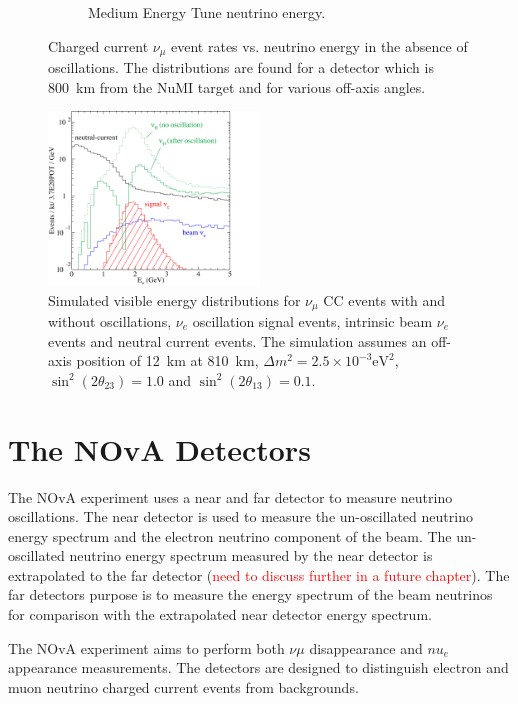 \begin{figure}
\begin{subfigure}[b]{0.45\textwidth}
    \caption{Medium Energy Tune neutrino energy.}
    \label{fig:NuESpectra_MEAndLE_b}
  \end{subfigure}
  \caption{Charged current $\nu_{\mu}$ event rates vs. neutrino
    energy in the absence of oscillations. The distributions are found
  for a detector which is 800~km from the NuMI target and for various
  off-axis angles.}
  \label{fig:NuESpectra_MEAndLE}
\end{figure}


\begin{figure}
  \centering
  \includegraphics[width=0.5\textwidth]{../../img/beam/060-sig-and-bg-rates-thumb.png}
  \caption{Simulated visible energy distributions for $\nu_{\mu}$ CC
    events with and without oscillations, $\nu_e$ oscillation signal events,
    intrinsic beam $\nu_e$ events and neutral current events. The
    simulation assumes an off-axis position of 12~km at 810~km, $\Delta m^2 = 2.5 \times 10^{-3}
    \textrm{eV}^2$, $\sin^2(2\theta_{23}) = 1.0$ and
  $\sin^2(2\theta_{13}) = 0.1$.}
  \label{fig:NuMIBeamComp}
\end{figure}


\section{The NOvA Detectors}

The NOvA experiment uses a near and far detector to measure neutrino
oscillations. The near detector is used to measure the un-oscillated
neutrino energy spectrum and the electron neutrino component of the
beam. The un-oscillated neutrino energy spectrum measured by the near
detector is extrapolated to the far detector (\textcolor{red}{need to
  discuss further in a future chapter}). The far detectors purpose is
to measure the energy spectrum of the beam neutrinos for comparison
with the extrapolated near detector energy spectrum.

The NOvA experiment aims to perform both $\nu{\mu}$ disappearance and
$nu_e$ appearance measurements. The
detectors are designed to distinguish electron and muon neutrino
charged current events from backgrounds. 

